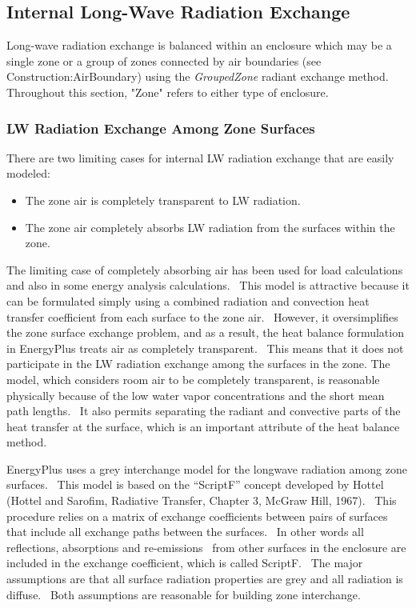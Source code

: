 \subsection{Internal Long-Wave Radiation Exchange}\label{internal-long-wave-radiation-exchange}

Long-wave radiation exchange is balanced within an enclosure which may be a single zone or a group of zones connected by air boundaries (see Construction:AirBoundary) using the \textit{GroupedZone} radiant exchange method. Throughout this section, "Zone" refers to either type of enclosure.

\subsubsection{LW Radiation Exchange Among Zone Surfaces}\label{lw-radiation-exchange-among-zone-surfaces}

There are two limiting cases for internal LW radiation exchange that are easily modeled:

\begin{itemize}
\item
The zone air is completely transparent to LW radiation.
\item
The zone air completely absorbs LW radiation from the surfaces within the zone.
\end{itemize}

The limiting case of completely absorbing air has been used for load calculations and also in some energy analysis calculations.~ This model is attractive because it can be formulated simply using a combined radiation and convection heat transfer coefficient from each surface to the zone air.~ However, it oversimplifies the zone surface exchange problem, and as a result, the heat balance formulation in EnergyPlus treats air as completely transparent.~ This means that it does not participate in the LW radiation exchange among the surfaces in the zone. The model, which considers room air to be completely transparent, is reasonable physically because of the low water vapor concentrations and the short mean path lengths.~ It also permits separating the radiant and convective parts of the heat transfer at the surface, which is an important attribute of the heat balance method.

EnergyPlus uses a grey interchange model for the longwave radiation among zone surfaces.~ This model is based on the ``ScriptF'' concept developed by Hottel (Hottel and Sarofim, Radiative Transfer, Chapter 3, McGraw Hill, 1967).~ This procedure relies on a matrix of exchange coefficients between pairs of surfaces that include all exchange paths between the surfaces.~ In other words all reflections, absorptions and re-emissions~ from other surfaces in the enclosure are included in the exchange coefficient, which is called ScriptF.~ The major assumptions are that all surface radiation properties are grey and all radiation is diffuse.~ Both assumptions are reasonable for building zone interchange.

